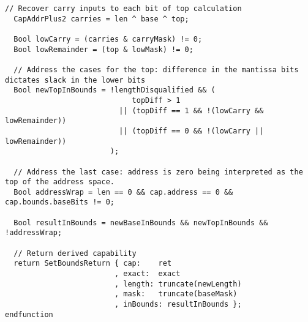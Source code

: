 \begin{lstlisting}[language=bluespec]
  // Recover carry inputs to each bit of top calculation
  CapAddrPlus2 carries = len ^ base ^ top;

  Bool lowCarry = (carries & carryMask) != 0;
  Bool lowRemainder = (top & lowMask) != 0;

  // Address the cases for the top: difference in the mantissa bits dictates slack in the lower bits
  Bool newTopInBounds = !lengthDisqualified && (
                             topDiff > 1
                          || (topDiff == 1 && !(lowCarry && lowRemainder))
                          || (topDiff == 0 && !(lowCarry || lowRemainder))
                        );

  // Address the last case: address is zero being interpreted as the top of the address space.
  Bool addressWrap = len == 0 && cap.address == 0 && cap.bounds.baseBits != 0;

  Bool resultInBounds = newBaseInBounds && newTopInBounds && !addressWrap;

  // Return derived capability
  return SetBoundsReturn { cap:    ret
                         , exact:  exact
                         , length: truncate(newLength)
                         , mask:   truncate(baseMask)
                         , inBounds: resultInBounds };
endfunction
\end{lstlisting}
